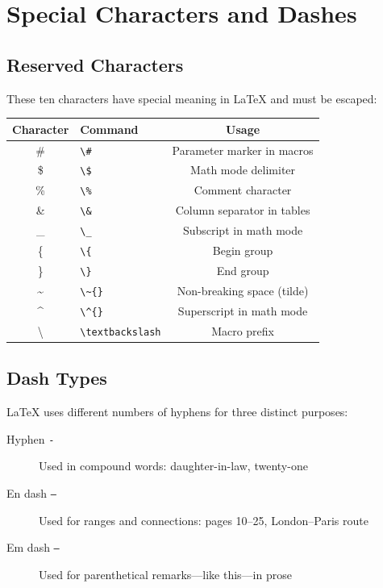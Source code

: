 \documentclass[12pt,a4paper]{article}
\begin{document}

\section{Special Characters and Dashes}
\label{sec:special}

\subsection{Reserved Characters}

These ten characters have special meaning in \LaTeX{} and must be escaped:

\medskip
\begin{center}
\begin{tabular}{clc}
\hline
\textbf{Character} & \textbf{Command} & \textbf{Usage} \\
\hline
\#  & \verb|\#|  & Parameter marker in macros \\
\$  & \verb|\$|  & Math mode delimiter \\
\%  & \verb|\%|  & Comment character \\
\&  & \verb|\&|  & Column separator in tables \\
\_  & \verb|\_|  & Subscript in math mode \\
\{  & \verb|\{|  & Begin group \\
\}  & \verb|\}|  & End group \\
\~{} & \verb|\~{}| & Non-breaking space (tilde) \\
\^{} & \verb|\^{}| & Superscript in math mode \\
\textbackslash & \verb|\textbackslash| & Macro prefix \\
\hline
\end{tabular}
\end{center}

\subsection{Dash Types}

\LaTeX{} uses different numbers of hyphens for three distinct purposes:

\begin{description}
    \item[Hyphen \texttt{-}] Used in compound words: daughter-in-law, twenty-one
    \item[En dash \texttt{--}] Used for ranges and connections: pages 10--25, London--Paris route
    \item[Em dash \texttt{---}] Used for parenthetical remarks---like this---in prose
\end{description}
\end{document}
